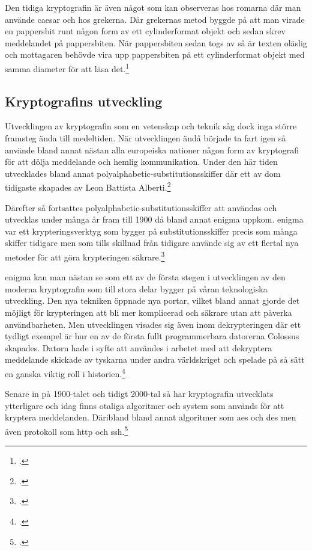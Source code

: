 Den tidiga kryptografin är även något som kan observeras hos romarna där
man använde \gls{caesar} och hos grekerna. Där grekernas metod byggde på
att man virade en pappersbit runt någon form av ett cylinderformat objekt
och sedan skrev meddelandet på pappersbiten. När pappersbiten sedan togs
av så är texten oläslig och mottagaren behövde vira upp pappersbiten på
ett cylinderformat objekt med samma diameter för att läsa det.\footcite{kryptografi-historia-1}

\subsection{Kryptografins utveckling} %
Utvecklingen av kryptografin som en vetenskap och teknik såg dock inga större framsteg
ända till medeltiden. När utvecklingen ändå började ta fart igen så använde bland annat
nästan alla europeiska nationer någon form av kryptografi för att dölja meddelande och hemlig kommunikation.
Under den här tiden utvecklades bland annat \gls{polyalphabetic-substitutionsskiffer} där ett av dom tidigaste skapades av
Leon Battista Alberti.\footcite{kryptografi-historia-1}

Därefter så fortsattes \gls{polyalphabetic-substitutionsskiffer} att användas och utvecklas
under många år fram till 1900 då bland annat \gls{enigma} uppkom. \gls{enigma} var ett krypteringsverktyg som
bygger på \gls{substitutionsskiffer} precis som många skiffer tidigare men som tills skillnad från tidigare
använde sig av ett flertal nya metoder för att göra krypteringen säkrare.\footcite{kryptografi-historia-1}

\gls{enigma} kan man nästan se som ett av de första stegen i utvecklingen av den moderna kryptografin som
till stora delar bygger på våran teknologiska utveckling. Den nya tekniken öppnade nya portar, vilket bland annat gjorde det möjligt
för krypteringen att bli mer komplicerad och säkrare utan att påverka användbarheten. Men utvecklingen visades sig även inom
dekrypteringen där ett tydligt exempel är hur en av de första fullt programmerbara datorerna Colossus skapades. Datorn hade i syfte
att användes i arbetet med att dekryptera meddelande skickade av tyskarna under andra världskriget och spelade på så sätt
en ganska viktig roll i historien.\footcite{krypto}

Senare in på 1900-talet och tidigt 2000-tal så har kryptografin utvecklats ytterligare och idag finns otaliga
algoritmer och system som används för att kryptera meddelanden. Däribland bland annat algoritmer som \gls{aes} och \gls{des} men även
protokoll som \gls{http} och \gls{ssh}.\footcite{krypto}

